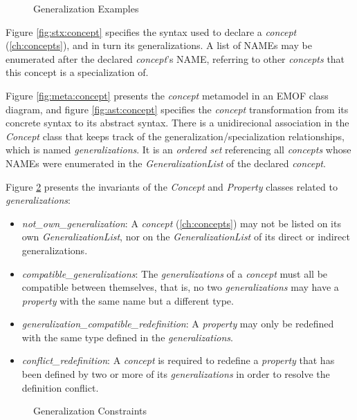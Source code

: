 \begin{figure}
\verbatimfont{\small}

\caption{Generalization Examples}
\label{fig:ex:generalization}
\end{figure}

\begin{concrete-syntax}
Figure \ref{fig:stx:concept} specifies the syntax used
to declare a \emph{concept} (\ref{ch:concepts}),
and in turn its generalizations.
A list of NAMEs may be enumerated after the declared \emph{concept}'s NAME,
referring to other \emph{concepts} that this concept is a specialization of.
\end{concrete-syntax}

\begin{abstract-syntax}
Figure \ref{fig:meta:concept} presents the \emph{concept} metamodel
in an EMOF \cite{mof} class diagram,
and figure \ref{fig:ast:concept} specifies
the \emph{concept} transformation
from its concrete syntax to its abstract syntax.
There is a unidirecional association in the \emph{Concept} class
that keeps track of the generalization/specialization relationships,
which is named \emph{generalizations}.
It is an \emph{ordered set} referencing all \emph{concepts}
whose NAMEs were enumerated in the \emph{GeneralizationList}
of the declared \emph{concept}.
\end{abstract-syntax}

\begin{constraints}
Figure \ref{fig:ocl:generalization} presents the invariants
of the \emph{Concept} and \emph{Property} classes
related to \emph{generalizations}:

\begin{itemize}

\item \emph{not\_own\_generalization}:
A \emph{concept} (\ref{ch:concepts}) may not be listed on its own \emph{GeneralizationList},
nor on the \emph{GeneralizationList} of its direct or indirect generalizations.

\item \emph{compatible\_generalizations}:
The \emph{generalizations} of a \emph{concept} must all be compatible between themselves,
that is, no two \emph{generalizations} may have a \emph{property} with the same name
but a different type.

\item \emph{generalization\_compatible\_redefinition}:
A \emph{property} may only be redefined with the same type defined in the \emph{generalizations}.

\item \emph{conflict\_redefinition}:
A \emph{concept} is required to redefine a \emph{property} that 
has been defined by two or more of its \emph{generalizations}
in order to resolve the definition conflict.

\end{itemize}
\end{constraints}

\begin{figure}

\caption{Generalization Constraints}
\label{fig:ocl:generalization}
\end{figure}
